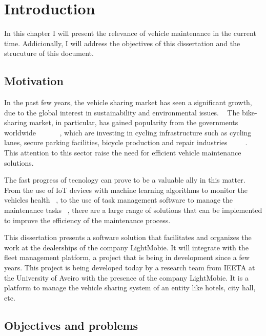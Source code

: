 \chapter{Introduction}%
\label{chapter:introduction}

\begin{introduction}
In this chapter I will present the relevance of vehicle maintenance in the current time. Addicionally, I will address the objectives of this dissertation and the strucuture of this document.
\end{introduction} 


\section{Motivation}

In the past few years, the vehicle sharing market has seen a significant growth, due to the global interest in sustainability and environmental issues. ~\cite{bike_data_businessresearch}
The bike-sharing market, in particular, has gained popularity from the governments worldwide ~\cite{Clercq2023} ~\cite{Cerro2024} ~\cite{European_declararion_on_cycling} ~\cite{cohesionOpenData}, which are investing in cycling infrastructure such as cycling lanes, secure parking facilities, bicycle production and repair industries ~\cite{Cerro2024} ~\cite{European_declararion_on_cycling} ~\cite{cohesionOpenData}.
This attention to this sector raise the need for efficient vehicle maintenance solutions.

The fast progress of tecnology can prove to be a valuable ally in this matter. 
From the use of IoT devices with machine learning algorithms to monitor the vehicles health ~\cite{Vasavi2021}, 
to the use of task management software to manage the maintenance tasks ~\cite{MARS_MOTORS}, 
there are a large range of solutions that can be implemented to improve the efficiency of the maintenance process.

This dissertation presents a software solution that facilitates and organizes the work at the dealerships of the company LightMobie. 
It will integrate with the fleet management platform, a project that is being in development since a few years. 
This project is being developed today by a research team from  \ac{IEETA} at the University of Aveiro with the presence of the company LightMobie.
It is a platform to manage the vehicle sharing system of an entity like hotels, city hall, etc.  

\section{Objectives and problems}

